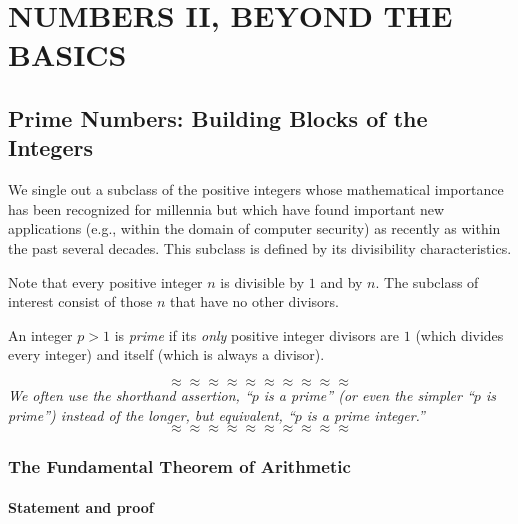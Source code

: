 
\chapter{NUMBERS II, BEYOND THE BASICS}
\label{ch:numbers-advanced}


\section{Prime Numbers: Building Blocks of the Integers}
\label{sec:primes}

We single out a subclass of the positive integers whose mathematical
importance has been recognized for millennia but which have found
important new applications (e.g., within the domain of computer
security) as recently as within the past several decades.  This
subclass is defined by its divisibility characteristics.

Note that every positive integer $n$ is divisible by $1$ and by $n$.
The subclass of interest consist of those $n$ that have no other
divisors.

An integer $p >1$ is {\it prime}
if its {\em only} positive integer divisors are $1$ (which divides
every integer) and itself (which is always a divisor).

\[ \approx \approx \approx \approx \approx \approx \approx \approx \approx \approx \]
{\em We often use the shorthand assertion, ``$p$ is a prime'' (or even
  the simpler ``$p$ is prime'') instead of the longer, but equivalent,
  ``$p$ is a prime integer.''}
\[ \approx \approx \approx \approx \approx \approx \approx \approx \approx \approx \]

  
\subsection{The Fundamental Theorem of Arithmetic}
\label{sec:Fund-Thm-Arith}

\subsubsection{Statement and proof}
\label{sec:FTA-basics}

